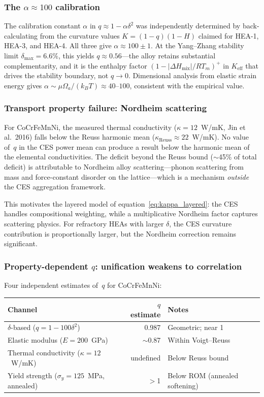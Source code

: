 \documentclass[12pt,letterpaper]{article}
\theoremstyle{definition}
\begin{document}
\subsubsection{The $\alpha \approx 100$ calibration}

The calibration constant $\alpha$ in $q \approx 1 - \alpha\delta^2$ was independently determined by back-calculating from the curvature values $K = (1-q)(1-H)$ claimed for HEA-1, HEA-3, and HEA-4.  All three give $\alpha \approx 100 \pm 1$.  At the Yang--Zhang stability limit $\delta_{\max} = 6.6\%$, this yields $q \approx 0.56$---the alloy retains substantial complementarity, and it is the enthalpy factor $(1 - |\Delta H_{\mathrm{mix}}|/RT_m)^+$ in $K_{\mathrm{eff}}$ that drives the stability boundary, not $q \to 0$.  Dimensional analysis from elastic strain energy gives $\alpha \sim \mu\Omega_a/(k_BT) \approx 40$--$100$, consistent with the empirical value.

\subsubsection{Transport property failure: Nordheim scattering}\label{sec:transport_fail}

For CoCrFeMnNi, the measured thermal conductivity ($\kappa = 12$~W/mK, Jin et al.\ 2016) falls below the Reuss harmonic mean ($\kappa_{\mathrm{Reuss}} \approx 22$~W/mK).  No value of~$q$ in the CES power mean can produce a result below the harmonic mean of the elemental conductivities.  The deficit beyond the Reuss bound ($\sim$45\% of total deficit) is attributable to Nordheim alloy scattering---phonon scattering from mass and force-constant disorder on the lattice---which is a mechanism \emph{outside} the CES aggregation framework.

This motivates the layered model of equation~\ref{eq:kappa_layered}: the CES handles compositional weighting, while a multiplicative Nordheim factor captures scattering physics.  For refractory HEAs with larger $\delta$, the CES curvature contribution is proportionally larger, but the Nordheim correction remains significant.

\subsubsection{Property-dependent $q$: unification weakens to correlation}

Four independent estimates of~$q$ for CoCrFeMnNi:
\begin{center}
\begin{tabular}{@{}lrl@{}}
\toprule
Channel & $q$ estimate & Notes \\
\midrule
$\delta$-based ($q = 1 - 100\delta^2$) & 0.987 & Geometric; near 1 \\
Elastic modulus ($E = 200$~GPa) & $\sim$0.87 & Within Voigt--Reuss \\
Thermal conductivity ($\kappa = 12$~W/mK) & undefined & Below Reuss bound \\
Yield strength ($\sigma_y = 125$~MPa, annealed) & $>$1 & Below ROM (annealed softening) \\
\bottomrule
\end{tabular}
\end{center}
\end{document}

